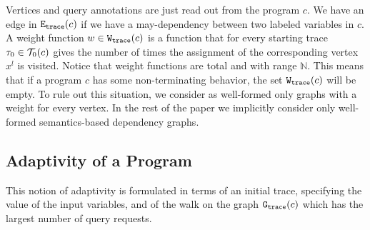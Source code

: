  Vertices and query annotations are just read out from the program $c$. We have an edge in $\mathtt{{E_{trace}}}(c)$ if we have a may-dependency between two labeled variables in $c$.
A weight function $w \in \mathtt{{W_{trace}}}(c)$ is a function that for every starting trace $\mathtt{\tau}_0 \in \mathcal{T}_0(c)$ 
gives the number of times the assignment of the corresponding vertex $x^l$ is visited. Notice that weight functions are total and with range $\mathbb{N}$. This means that if a program $c$ has some non-terminating behavior, the set $\mathtt{{W_{trace}}}(c)$ will be empty. 
To rule out this situation, we consider as well-formed only graphs with a weight for every vertex. 
In the rest of the paper we  implicitly consider only well-formed semantics-based dependency graphs. 




  \subsection{Adaptivity of a Program}
  \label{sec:sematnic_adaptivity}
 This notion of adaptivity is formulated in terms of an initial trace, specifying the value of the input variables, and of the walk on the graph $\mathtt{{G_{trace}}}({c})$ which has the largest number of query requests.

